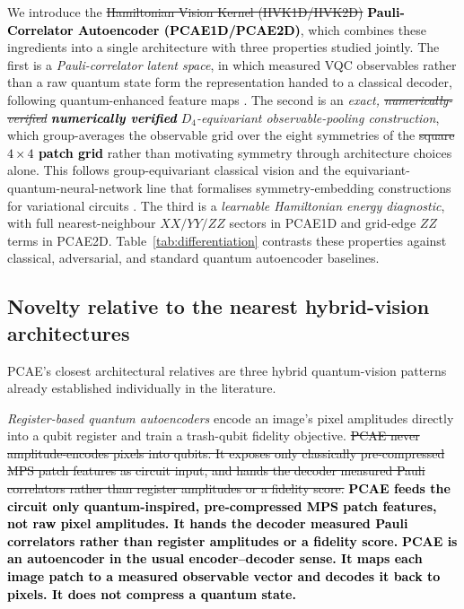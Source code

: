 \documentclass[pdflatex,sn-basic]{sn-jnl}
\newcommand{\del}[1]{\sout{#1}}
\newcommand{\add}[1]{\textbf{\textcolor{black}{#1}}}
\begin{document}
We introduce the \del{Hamiltonian Vision Kernel (HVK1D/HVK2D)} \add{Pauli-Correlator Autoencoder (PCAE1D/PCAE2D)}, which combines these
ingredients into a single architecture with three properties studied jointly.
The first is a \emph{Pauli-correlator latent space}, in which measured VQC
observables rather than a raw quantum state form the representation handed to a
classical decoder, following quantum-enhanced feature maps \citep{Havlicek2019}.
The second is an \emph{exact, \del{numerically-verified} \add{numerically verified} $D_4$-equivariant
observable-pooling construction}, which group-averages the observable grid over
the eight symmetries of the \del{square} \add{$4\times4$ patch grid} rather than motivating symmetry through
architecture choices alone. This follows group-equivariant classical vision
\citep{Cohen2016, Bronstein2021} and the equivariant-quantum-neural-network line
that formalises symmetry-embedding constructions for variational circuits
\citep{Meyer2023, Nguyen2024EQNN, Schatzki2024, West2024, West2024Erratum}. The
third is a \emph{learnable Hamiltonian energy diagnostic}, with full
nearest-neighbour $XX/YY/ZZ$ sectors in PCAE1D and grid-edge $ZZ$ terms in PCAE2D.
Table~\ref{tab:differentiation} contrasts these properties against classical,
adversarial, and standard quantum autoencoder baselines.

\subsection*{Novelty relative to the nearest hybrid-vision architectures}

PCAE's closest architectural relatives are three hybrid quantum-vision patterns
already established individually in the literature.

\emph{Register-based quantum autoencoders}
\citep{Romero2017, WangQAECompression2024, QAEClassification2025} encode an
image's pixel amplitudes directly into a qubit register and train a trash-qubit
fidelity objective. \del{PCAE never amplitude-encodes pixels into qubits. It exposes
only classically pre-compressed MPS patch features as circuit input, and hands
the decoder measured Pauli correlators rather than register amplitudes or a
fidelity score.} \add{PCAE feeds the circuit only quantum-inspired,
pre-compressed MPS patch features, not raw pixel amplitudes. It hands the
decoder measured Pauli correlators rather than register amplitudes or a
fidelity score.} \add{PCAE is an autoencoder in the usual encoder--decoder sense.
It maps each image patch to a measured observable vector and decodes it back to
pixels. It does not compress a quantum state.}
\end{document}
